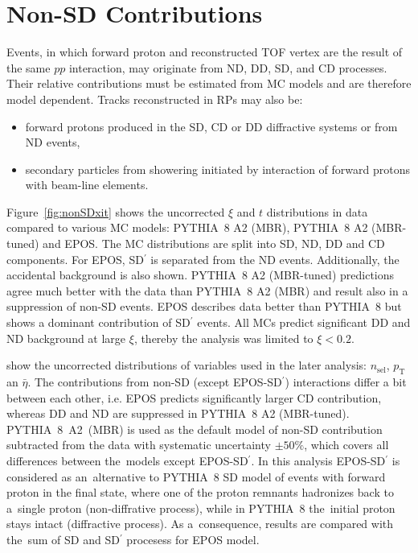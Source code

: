 \chapter{Non-SD Contributions}\label{section:star_nonSD}
Events, in which  forward proton and reconstructed TOF
vertex are the result of the same $pp$ interaction, may originate from \ac{ND}, \ac{DD}, \ac{SD}, and \ac{CD} processes.  Their relative contributions must be estimated from MC models and are therefore model dependent. Tracks reconstructed in \ac{RP}s  %
may also be:
\begin{itemize}
	\item forward protons produced in the \ac{SD}, \ac{CD} or \ac{DD} diffractive systems or from \ac{ND} events,
	\item secondary particles from showering initiated 
	by interaction of forward protons with beam-line elements.
\end{itemize}

Figure~\ref{fig:nonSDxit} shows the uncorrected $\xi$ and $t$ distributions in data compared to various \ac{MC} models: PYTHIA~8 A2 (MBR), PYTHIA~8 A2 (MBR-tuned) and EPOS. The \ac{MC} distributions are split into \ac{SD}, \ac{ND}, \ac{DD} and \ac{CD} components. For EPOS, SD$^\prime$ is separated from the ND events. Additionally, the accidental background is also shown. PYTHIA~8 A2 (MBR-tuned) predictions agree much better with the data than PYTHIA~8 A2 (MBR)  and result also in a suppression of non-SD events. EPOS describes data better than PYTHIA~8 but shows a dominant contribution of SD$^\prime$ events. All MCs predict significant \ac{DD} and \ac{ND} background at large $\xi$, thereby  the analysis was limited to $\xi < 0.2$. 

  show the uncorrected distributions of variables used in the later analysis: $n_{\mathrm{sel}}$, $p_{\mathrm T}$ an $\bar{\eta}$. The  contributions from non-SD (except  EPOS-SD$^\prime$) interactions differ a bit between each other, i.e. EPOS predicts significantly larger CD contribution, whereas DD and ND are suppressed in PYTHIA~8 A2 (MBR-tuned).  PYTHIA~8~A2~(MBR) is used as the default model  of non-SD contribution subtracted from the data with systematic uncertainty $\pm50\%$, which covers all differences between the~models except EPOS-SD$^\prime$.  In this analysis EPOS-SD$^\prime$ is   considered as an~alternative to PYTHIA~8 SD model of events with forward proton in the final state,  where one of the proton remnants hadronizes back to a~single proton (non-diffrative process), while in  PYTHIA~8 the~initial proton stays intact (diffractive process). As a~consequence, results  are compared  with the~sum of SD and SD$^\prime$ procesess for EPOS model.   %

